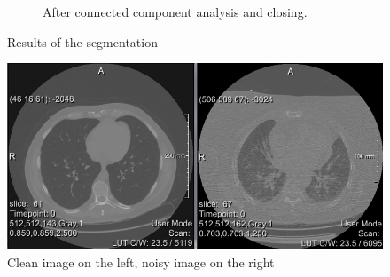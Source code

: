 \documentclass[a4paper,10pt]{article}
\numberwithin{equation}{section} %
\numberwithin{figure}{section} %
\numberwithin{table}{section} %
\begin{document}
\begin{figure}[h]
\begin{subfigure}[b]{0.42\textwidth}
        \caption{After connected component analysis and closing.}
        \label{fig:lungs}
    \end{subfigure}
    \caption{Results of the segmentation}\label{fig:lung-segmentation}
\end{figure}

\begin{figure}[h]
	\centering
	\includegraphics[scale=0.6]{Noisy_and_clean}
	\caption{Clean image on the left, noisy image on the right}
	\label{fig:noisy}
\end{figure}




\end{document}
